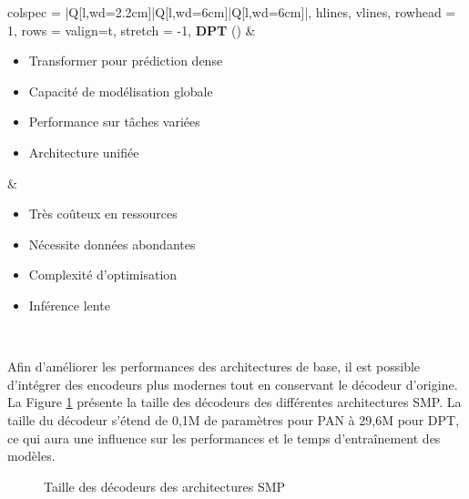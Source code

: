 \begin{longtblr}[
  caption = {Avantages et inconvénients des architectures proposées dans SMP},
  label = {tab:ch36_architecture_smp_avantage_inconvenient},
]{
  colspec = {|Q[l,wd=2.2cm]|Q[l,wd=6cm]|Q[l,wd=6cm]|},
  hlines,
  vlines,
  rowhead = 1,
  rows = {valign=t},
  stretch = -1,
}
\textbf{DPT} (\citeyear{ranftl_vision_2021}) \cite{ranftl_vision_2021} & 
\begin{itemize}[leftmargin=0.4cm]
    \item Transformer pour prédiction dense
    \item Capacité de modélisation globale
    \item Performance sur tâches variées
    \item Architecture unifiée
\end{itemize} & 
\begin{itemize}[leftmargin=0.4cm]
    \item Très coûteux en ressources
    \item Nécessite données abondantes
    \item Complexité d'optimisation
    \item Inférence lente
\end{itemize} \\
\end{longtblr}


Afin d'améliorer les performances des architectures de base, il est possible d'intégrer des encodeurs plus modernes tout en conservant le décodeur d'origine. La Figure \ref{fig:ch36_architecture_02_architecture_taille_decodeur} présente la taille des décodeurs des différentes architectures SMP. La taille du décodeur s'étend de 0,1M de paramètres pour PAN à 29,6M pour DPT, ce qui aura une influence sur les performances et le temps d'entraînement des modèles.

\begin{figure}[H]
    \centering
    \caption{Taille des décodeurs des architectures SMP}
    \label{fig:ch36_architecture_02_architecture_taille_decodeur}
\end{figure}

